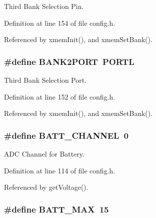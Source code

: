 Third Bank Selection Pin. 



Definition at line 154 of file config.\-h.



Referenced by xmem\-Init(), and xmem\-Set\-Bank().

\hypertarget{group__config_gad35afb0251524c201c2d60f3d035af32}{
\subsubsection[{B\-A\-N\-K2\-P\-O\-R\-T}]{\setlength{\rightskip}{0pt plus 5cm}\#define B\-A\-N\-K2\-P\-O\-R\-T~P\-O\-R\-T\-L}}\label{group__config_gad35afb0251524c201c2d60f3d035af32}


Third Bank Selection Port. 



Definition at line 152 of file config.\-h.



Referenced by xmem\-Init(), and xmem\-Set\-Bank().

\hypertarget{group__config_ga9fd748b19523c96052a2964d73a7b0f5}{
\subsubsection[{B\-A\-T\-T\-\_\-\-C\-H\-A\-N\-N\-E\-L}]{\setlength{\rightskip}{0pt plus 5cm}\#define B\-A\-T\-T\-\_\-\-C\-H\-A\-N\-N\-E\-L~0}}\label{group__config_ga9fd748b19523c96052a2964d73a7b0f5}


A\-D\-C Channel for Battery. 



Definition at line 114 of file config.\-h.



Referenced by get\-Voltage().

\hypertarget{group__config_gac873c87f494ea2b22e7eb5fc74ad5a82}{
\subsubsection[{B\-A\-T\-T\-\_\-\-M\-A\-X}]{\setlength{\rightskip}{0pt plus 5cm}\#define B\-A\-T\-T\-\_\-\-M\-A\-X~15}}\label{group__config_gac873c87f494ea2b22e7eb5fc74ad5a82}



